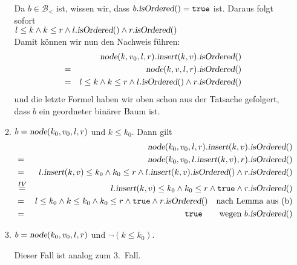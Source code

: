\documentclass{article}
\begin{document}
\begin{enumerate}
\begin{enumerate}
            Da $b\in \mathcal{B}_<$ ist, wissen wir, dass $b.\textsl{isOrdered}() = \mathtt{true}$
            ist.  Daraus folgt sofort
            \\[0.2cm]
            \hspace*{1.3cm}
            $l \leq k \wedge k \leq r \wedge l.\textsl{isOrdered}() \wedge r.\textsl{isOrdered}()$
            \\[0.2cm]
            Damit k\"onnen wir nun den Nachweis f\"uhren:
            \begin{eqnarray*}
            &   & \textsl{node}(k,v_0,l,r).\textsl{insert}(k,v).\textsl{isOrdered}() \\
            & = & \textsl{node}(k,v,l,r).\textsl{isOrdered}() \\
            & = & l \leq k \wedge k \leq r \wedge l.\textsl{isOrdered}() \wedge r.\textsl{isOrdered}() 
            \end{eqnarray*}
            und die letzte Formel haben wir oben schon aus der Tatsache gefolgert,
            dass $b$ ein geordneter bin\"arer Baum ist.
      \item $b = \textsl{node}(k_0,v_0,l,r)$ und $k \leq k_0$.  Dann gilt
            \begin{eqnarray*}
            &   & \textsl{node}(k_0,v_0,l,r).\textsl{insert}(k,v).\textsl{isOrdered}() \\
            & = & \textsl{node}(k_0,v_0,l.\textsl{insert}(k,v),r).\textsl{isOrdered}() \\
            & = & l.\textsl{insert}(k,v) \leq k_0 \wedge k_0 \leq r
                  \wedge l.\textsl{insert}(k,v).\textsl{isOrdered}() \wedge r.\textsl{isOrdered}() \\
            & \stackrel{IV}{=} & l.\textsl{insert}(k,v) \leq k_0 \wedge k_0 \leq r \wedge
                  \mathtt{true} \wedge r.\textsl{isOrdered}() \\
            & = & l \leq k_0 \wedge  k \leq k_0 \wedge k_0 \leq r \wedge
                  \mathtt{true} \wedge r.\textsl{isOrdered}() \quad\mbox{nach Lemma aus (b)}\\
            & = & \mathtt{true} \qquad\mbox{wegen $b.\textsl{isOrdered}()$}
            \end{eqnarray*}
      \item $b = \textsl{node}(k_0,v_0,l,r)$ und $\neg(k \leq k_0)$. 

            Dieser Fall ist analog zum 3.~Fall.
      \end{enumerate}
\end{enumerate}
\end{document}
